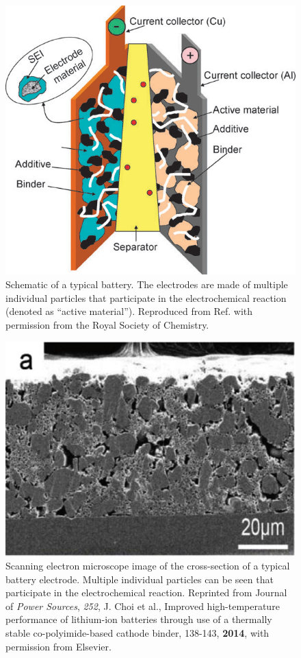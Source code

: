 \documentclass[journal=cmatex,manuscript=perspective]{achemso}
\begin{document}
\begin{figure}
  \includegraphics[width=\textwidth]{multiscale-1.png}
  \caption{Schematic of a typical battery. The electrodes are made of
    multiple individual particles that participate in the
    electrochemical reaction (denoted as ``active
    material''). Reproduced from Ref.\cite{palacin2009} with
    permission from the Royal Society of Chemistry.}
  \label{figure:multiscale-1}
\end{figure}

\begin{figure}
  \includegraphics[width=\textwidth]{multiscale-2.png}
  \caption{Scanning electron microscope image of the cross-section of
    a typical battery electrode. Multiple individual particles can be
    seen that participate in the electrochemical reaction. Reprinted
    from Journal of \textit{Power Sources}, \textit{252}, J. Choi et
    al., Improved high-temperature performance of lithium-ion
    batteries through use of a thermally stable co-polyimide-based
    cathode binder, 138-143, \textbf{2014}, with permission from
    Elsevier.}
  \label{figure:multiscale-2}
\end{figure}
\end{document}
